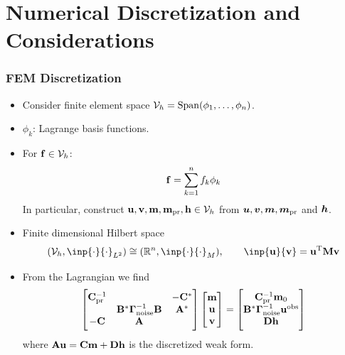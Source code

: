 \documentclass[
    pdf,
    10pt,
    xcolor={svgnames},
  ]{beamer}
\newcommand{\mc}[1]{\mathcal{#1}}
\newcommand{\R}{\mathbb{R}}
\newcommand{\T}{\mathrm{T}}
\renewcommand{\vec}[1]{{\mathchoice
                     {\mbox{\boldmath$\displaystyle{#1}$}}
                     {\mbox{\boldmath$\textstyle{#1}$}}
                     {\mbox{\boldmath$\scriptstyle{#1}$}}
                     {\mbox{\boldmath$\scriptscriptstyle{#1}$}}}}
\newcommand{\mat}[1]{\mathbf{{#1}}}
\newcommand{\obs}{\mathbf{u}^{\rm obs}}
\begin{document}
\section{Numerical Discretization and Considerations}
\begin{frame}
  \frametitle{FEM Discretization}
  \begin{itemize}
    \item Consider finite element space $\mc{V}_h = {\rm Span}(\phi_1, \dots,
      \phi_n)$.
    \item $\phi_k$: Lagrange basis functions. 
    \item For $\vb{f} \in \mc{V}_h$:
      \[
        \vb{f} = \sum_{k=1}^n f_k \phi_k
      \]
    In particular, construct $\vb{u}, \vb{v}, \vb{m}, \vb{m}_{\rm pr},
      \vb{h} \in \mc{V}_h$ from $\vec{u}, \vec{v}, \vec{m}, \vec{m}_{\rm pr}$
      and $\vec{h}$.
    \item Finite dimensional Hilbert space 
      \[
        (\mc{V}_h, \inp{\cdot}{\cdot}_{L^2})
        \cong 
        (\R^n, \inp{\cdot}{\cdot}_M),
        \qquad \inp{\vb{u}}{\vb{v}} = \vb{u}^\T \mat{M} \vb{v}
      \]
    \item From the Lagrangian we find
      \[
        \begin{bmatrix}
          \mat{C}_{\rm pr}^{-1} & & -\mat{C}^* \\
          & \mat{B}^* \vb{\Gamma}_{\rm noise}^{-1} \mat{B} & \mat{A}^* \\
          -\mat{C} & \mat{A} & 
        \end{bmatrix}
        \begin{bmatrix} \vb{m} \\ \vb{u} \\ \vb{v} \end{bmatrix}
        = \begin{bmatrix}
          \mat{C}_{\rm pr}^{-1} \vb{m}_0 \\ 
          \mat{B}^* \vb{\Gamma}_{\rm noise}^{-1} \obs \\
          \mat{D} \vb{h}
        \end{bmatrix}
      \]
      where $\mat{A} \vb{u} = \mat{C} \vb{m} + \mat{D} \vb{h}$ is the discretized
      weak form.
  \end{itemize}
\end{frame}
\end{document}
